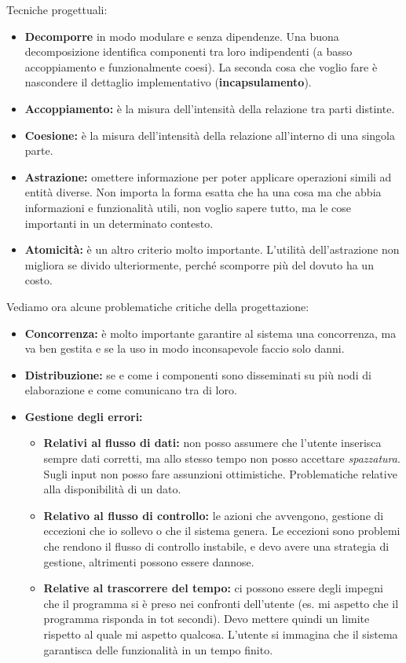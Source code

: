 Tecniche progettuali:
\begin{itemize}
	\item \textbf{Decomporre} in modo modulare e senza dipendenze. Una buona decomposizione identifica componenti tra loro indipendenti (a basso accoppiamento e funzionalmente coesi). La seconda cosa che voglio fare è nascondere il dettaglio implementativo (\textbf{incapsulamento}).
	\item\textbf{Accoppiamento:} è la misura dell'intensità della relazione tra parti distinte.
	\item\textbf{Coesione:} è la misura dell'intensità della relazione all'interno di una singola parte.
	\item\textbf{Astrazione:} omettere informazione per poter applicare operazioni simili ad entità diverse. Non importa la forma esatta che ha una cosa ma che abbia informazioni e funzionalità  utili, non voglio sapere tutto, ma le cose importanti in un determinato contesto.
	\item\textbf{Atomicità:} è un altro criterio molto importante. L'utilità  dell'astrazione non migliora se divido ulteriormente, perché scomporre più del dovuto ha un costo.
\end{itemize}
Vediamo ora alcune problematiche critiche della progettazione:
\begin{itemize}
	\item \textbf{Concorrenza:} è molto importante garantire al sistema una concorrenza, ma va ben gestita e se la uso in modo inconsapevole faccio solo danni.
	\item \textbf{Distribuzione:} se e come i componenti sono disseminati su più nodi di elaborazione e come comunicano tra di loro.
	\item \textbf{Gestione degli errori:} \begin{itemize}
	\item \textbf{Relativi al flusso di dati:} non posso assumere che l'utente inserisca sempre dati corretti, ma allo stesso tempo non posso accettare \textit{spazzatura}. Sugli input non posso fare assunzioni ottimistiche. Problematiche relative alla disponibilità di un dato.
		\item \textbf{Relativo al flusso di controllo:} le azioni che avvengono, gestione di eccezioni che io sollevo o che il sistema genera. Le eccezioni sono problemi che rendono il flusso di controllo instabile, e devo avere una strategia di gestione, altrimenti possono essere dannose.
		\item \textbf{Relative al trascorrere del tempo:} ci possono essere degli impegni che il programma si è preso nei confronti dell'utente (es. mi aspetto che il programma risponda in tot secondi). Devo mettere quindi un limite rispetto al quale mi aspetto qualcosa. L'utente si immagina che il sistema garantisca delle funzionalità in un tempo finito.
	\end{itemize}
\end{itemize}

